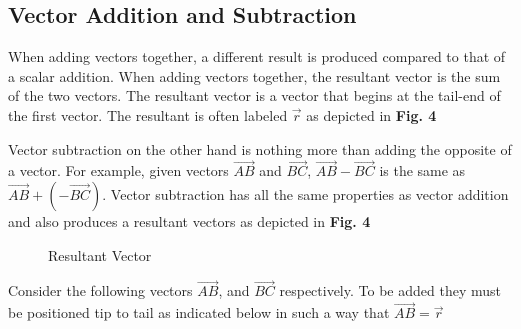 \documentclass[12.5pt]{article}
\begin{document}
        \subsection{Vector Addition and Subtraction}

        \begin{flushleft}
            
            When adding vectors together, a different result is produced compared to that of a scalar addition. 
            When adding vectors together, the resultant vector is the sum of the two vectors. The resultant vector 
            is a vector that begins at the tail-end of the first vector. The resultant is often labeled $\vec{r}$ as
            depicted in \textbf{Fig. 4}\newline

            Vector subtraction on the other hand is nothing more than adding the opposite of a vector. For example, 
            given vectors $\vec{AB}$ and $\vec{BC}$, $\vec{AB} - \vec{BC}$ is the same as $\vec{AB} + (-\vec{BC})$.
            Vector subtraction has all the same properties as vector addition and also produces a resultant vectors
            as depicted in \textbf{Fig. 4}

            \begin{figure}[h]
                \centering
                \caption{Resultant Vector}
            \end{figure}

            Consider the following vectors $\vec{AB}$, and $\vec{BC}$ respectively. To be added
            they must be positioned tip to tail as indicated below in such a way that $\vec{AB} = \vec{r}$


\end{flushleft}
\end{document}
